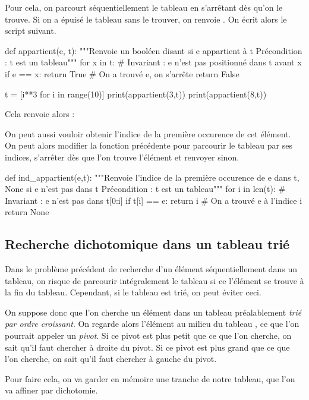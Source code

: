 Pour cela, on parcourt séquentiellement le tableau en s'arrêtant dès qu'on le trouve. Si on a épuisé 
le tableau sans le trouver, on renvoie . 
On écrit alors le script suivant.
\begin{pyblock}
def appartient(e, t):
    """Renvoie un booléen disant si e appartient à t
       Précondition : t est un tableau"""
    for x in t:
        # Invariant : e n'est pas positionné dans t avant x
        if e == x:
            return True # On a trouvé e, on s'arrête
    return False
 
t = [i**3 for i in range(10)]
print(appartient(3,t))
print(appartient(8,t))
\end{pyblock}
Cela renvoie alors :
\begin{quote}
  \printpythontex[verb]
\end{quote}
On peut aussi vouloir obtenir l'indice de la première occurence de cet élément.
On peut alors modifier la fonction précédente pour parcourir le tableau par ses indices, s'arrêter 
dès que l'on trouve l'élément et renvoyer  sinon.
\begin{pyverbatim}
def ind_appartient(e,t):
    """Renvoie l'indice de la première occurence de e dans t,
       None si e n'est pas dans t
       Précondition : t est un tableau"""
    for i in len(t):
        # Invariant : e n'est pas dans t[0:i]
        if t[i] == e:
            return i # On a trouvé e à l'indice i
    return None
\end{pyverbatim}

\subsection{Recherche dichotomique dans un tableau trié}

Dans le problème précédent de recherche d'un élément séquentiellement dans un tableau, on risque de parcourir intégralement le tableau si ce l'élément se trouve à la fin du tableau. 
Cependant, si le tableau est trié, on peut éviter ceci. 

On suppose donc que l'on cherche un élément dans un tableau préalablement \emph{trié par ordre croissant}. On regarde alors l'élément \og au milieu du tableau \fg{}, ce que l'on pourrait appeler un  \emph{pivot}. 
Si ce pivot est plus petit que ce que l'on cherche, on sait qu'il faut chercher à droite du pivot. 
Si ce pivot est plus grand que ce que l'on cherche, on sait qu'il faut chercher à gauche du pivot. 

Pour faire cela, on va garder en mémoire une tranche de notre tableau, que l'on va affiner par dichotomie. 

